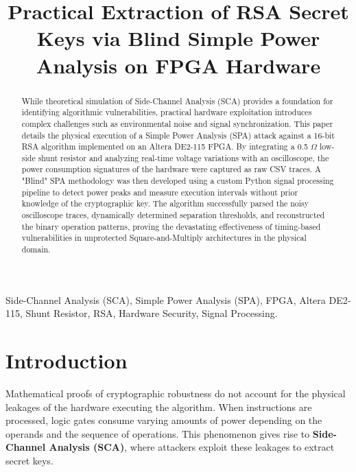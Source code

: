\documentclass[conference, a4paper]{IEEEtran}
\begin{document}
\title{Practical Extraction of RSA Secret Keys via Blind Simple Power Analysis on FPGA Hardware}

\author{
}

\maketitle

\begin{abstract}
While theoretical simulation of Side-Channel Analysis (SCA) provides a foundation for identifying algorithmic vulnerabilities, practical hardware exploitation introduces complex challenges such as environmental noise and signal synchronization. This paper details the physical execution of a Simple Power Analysis (SPA) attack against a 16-bit RSA algorithm implemented on an Altera DE2-115 FPGA. By integrating a 0.5 $\Omega$ low-side shunt resistor and analyzing real-time voltage variations with an oscilloscope, the power consumption signatures of the hardware were captured as raw CSV traces. A "Blind" SPA methodology was then developed using a custom Python signal processing pipeline to detect power peaks and measure execution intervals without prior knowledge of the cryptographic key. The algorithm successfully parsed the noisy oscilloscope traces, dynamically determined separation thresholds, and reconstructed the binary operation patterns, proving the devastating effectiveness of timing-based vulnerabilities in unprotected Square-and-Multiply architectures in the physical domain.
\end{abstract}

\begin{IEEEkeywords}
Side-Channel Analysis (SCA), Simple Power Analysis (SPA), FPGA, Altera DE2-115, Shunt Resistor, RSA, Hardware Security, Signal Processing.
\end{IEEEkeywords}

\section{Introduction}
Mathematical proofs of cryptographic robustness do not account for the physical leakages of the hardware executing the algorithm. When instructions are processed, logic gates consume varying amounts of power depending on the operands and the sequence of operations. This phenomenon gives rise to \textbf{Side-Channel Analysis (SCA)}, where attackers exploit these leakages to extract secret keys.
\end{document}
